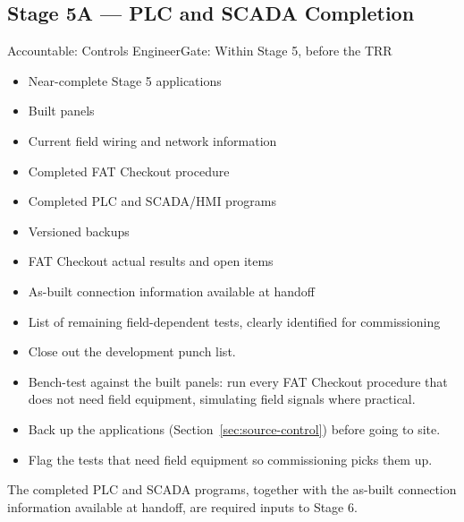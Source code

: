\subsection{Stage 5A --- PLC and SCADA Completion}
\begin{stagecard}{Accountable: Controls Engineer}{Gate: Within Stage 5, before the TRR}
\tcbline
\begin{minipage}[t]{0.485\linewidth}
\begin{itemize}[leftmargin=*,itemsep=1pt,topsep=2pt]
  \item Near-complete Stage 5 applications
  \item Built panels
  \item Current field wiring and network information
  \item Completed FAT Checkout procedure
\end{itemize}
\end{minipage}\hfill
\begin{minipage}[t]{0.485\linewidth}
\begin{itemize}[leftmargin=*,itemsep=1pt,topsep=2pt]
  \item Completed PLC and SCADA/HMI programs
  \item Versioned backups
  \item FAT Checkout actual results and open items
  \item As-built connection information available at handoff
  \item List of remaining field-dependent tests, clearly identified for commissioning
\end{itemize}
\end{minipage}
\tcbline
{}
\begin{itemize}[leftmargin=*,itemsep=1pt,topsep=2pt]
  \item Close out the development punch list.
  \item Bench-test against the built panels: run every FAT Checkout procedure that does not need field equipment, simulating field signals where practical.
  \item Back up the applications (Section~\ref{sec:source-control}) before going to site.
  \item Flag the tests that need field equipment so commissioning picks them up.
\end{itemize}
\end{stagecard}
The completed PLC and SCADA programs, together with the as-built connection information available at handoff, are required inputs to Stage 6.

